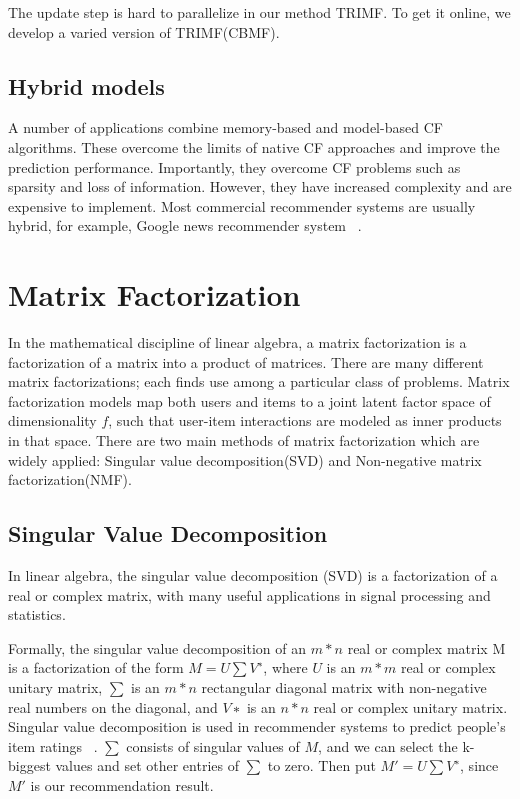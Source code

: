 The update step is hard to parallelize in our method TRIMF. To get it online, we develop a varied version of TRIMF(CBMF).

\hspace{0.05in}
\subsection{Hybrid models}
A number of applications combine memory-based and model-based CF algorithms.
These overcome the limits of native CF approaches and improve the prediction performance. Importantly, they overcome CF problems such as sparsity and loss of information. However, they have increased complexity and are expensive to implement. Most commercial recommender systems are usually hybrid, for example, Google news recommender system ~\cite{das2007google}.

\hspace{0.1in}
\section{Matrix Factorization}
In the mathematical discipline of linear algebra, a matrix factorization is a factorization of a matrix into a product of matrices. There are many different matrix factorizations; each finds use among a particular class of problems. Matrix factorization models map both users and items to a joint latent factor space of dimensionality $f$, such that user-item interactions are modeled as inner products in that space. There are two main methods of matrix factorization which are widely applied: Singular value decomposition(SVD) and Non-negative matrix factorization(NMF).
\hspace{0.05in}
\subsection{Singular Value Decomposition}
In linear algebra, the singular value decomposition (SVD) is a factorization of a real or complex matrix, with many useful applications in signal processing and statistics.

Formally, the singular value decomposition of an $m * n$ real or complex matrix M is a factorization of the form $M = U \sum V^∗$, where $U$ is an $m * m$ real or complex unitary matrix, $\sum$ is an $m * n$ rectangular diagonal matrix with non-negative real numbers on the diagonal, and $V∗$ is an $n * n$ real or complex unitary matrix. Singular value decomposition is used in recommender systems to predict people's item ratings ~\cite{Sarwar00applicationof}. $\sum$ consists of singular values of $M$, and we can select the k-biggest values and set other entries of $\sum$ to zero. Then put $M' = U \sum V^∗$, since $M'$ is our recommendation result.

